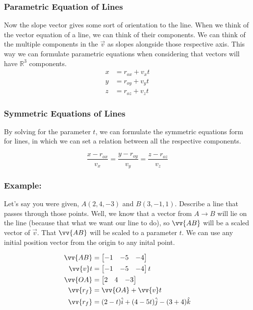 \subsubsection{Parametric Equation of Lines}
Now the slope vector gives some sort of orientation to the line. When we think of the vector equation of a line, we can think of their components. We can think of the multiple components in the $\vec{v}$ as slopes alongside those respective axis. This way we can formulate parametric equations when considering that vectors will have $\mathbb{R}^3$ components. 
\begin{align*}
	x &= r_{ox}+v_xt \\
	y &= r_{oy}+v_yt \\
	z &= r_{oz}+v_zt 
\end{align*}

\subsubsection{Symmetric Equations of Lines}
By solving for the parameter $t$, we can formulate the symmetric equations form for lines, in which we can set a relation between all the respective components.

\begin{equation*}	
	\frac{x-r_{ox}}{v_x} = \frac{y-r_{oy}}{v_y} = \frac{z-r_{oz}}{v_z}
\end{equation*}

\subsubsection{Example:}
Let's say you were given, $A(2,4,-3)$ and $B(3, -1, 1)$. Describe a line that passes through those points.
 Well, we know that a vector from $A \to B$ will lie on the line (because that what we want our line to do), 
so $\vv{AB}$ will be a scaled vector of $\vec{v}$. That $\vv{AB}$ will be scaled to a parameter $t$. We can use any initial position vector from the origin to any inital point.

\begin{align*}
	\vv{AB} &= \begin{bmatrix}
				-1 & -5 & -4 \\
			   \end{bmatrix} \\ 
	\vv{v}t &= \begin{bmatrix}
				-1 & -5 & -4 \\
			   \end{bmatrix}t \\  
	\vv{OA} &= \begin{bmatrix} 
				2 & 4 & -3 \\
				\end{bmatrix} \\
	\vv{r_f} &= \vv{OA} + \vv{v}t			\\
	\vv{r_f} &= (2-t)\hat{i} + (4-5t)\hat{j} - (3+4)\hat{k}
\end{align*}

